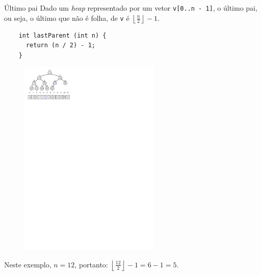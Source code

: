 \documentclass[t, 10pt]{beamer}
\begin{document}
  \begin{frame}[fragile]{Último pai}  
    Dado um \emph{heap} representado por um vetor \texttt{v[0..n - 1]},
    o último pai, ou seja, o último que não é folha, de \texttt{v} é 
    $\left\lfloor\frac{n}{2}\right\rfloor - 1$.
    
    \vspace{-1em}
    \begin{center}
    \begin{minipage}{0.35\textwidth}
    \begin{verbatim}
    int lastParent (int n) {
      return (n / 2) - 1;
    }
    \end{verbatim}
    \end{minipage}
    \end{center}
    
    \vspace{-1.5em}
    
    \begin{figure}[h!]
      \includegraphics[width=0.6\textwidth]{img/img18.pdf}
    \end{figure}

    \vspace{-0.5em}
    Neste exemplo, $n = 12$, portanto: 
    $\left\lfloor\frac{12}{2}\right\rfloor - 1 = 6 - 1 = 5$.
  \end{frame}
\end{document}
